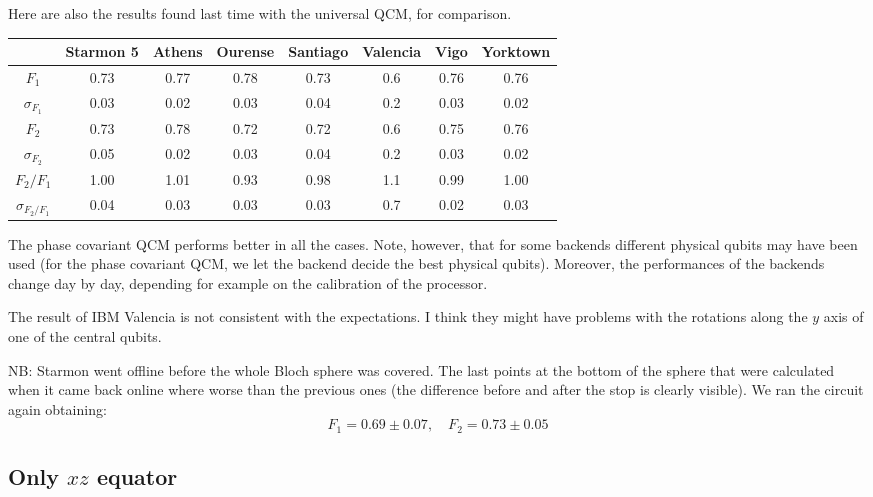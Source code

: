 \documentclass[11pt]{article}
\begin{document}
Here are also the results found last time with the universal QCM, for comparison.
\begin{table}[H]
    \centering
    \begin{tabular}{|c|c|c|c|c|c|c|c|}
    \hline
    \textbf{} & \textbf{Starmon 5} & \textbf{Athens} & \textbf{Ourense} & \textbf{Santiago} & \textbf{Valencia} & \textbf{Vigo} & \textbf{Yorktown} \\ \hline
    $F_1$              & 0.73 & 0.77 & 0.78 & 0.73 & 0.6 & 0.76 & 0.76 \\ \hline
    $\sigma_{F_1}$     & 0.03 & 0.02 & 0.03 & 0.04 & 0.2 & 0.03 & 0.02 \\ \hline
    $F_2$              & 0.73 & 0.78 & 0.72 & 0.72 & 0.6 & 0.75 & 0.76 \\ \hline
    $\sigma_{F_2}$     & 0.05 & 0.02 & 0.03 & 0.04 & 0.2 & 0.03 & 0.02 \\ \hline
    $F_2/F_1$          & 1.00 & 1.01 & 0.93 & 0.98 & 1.1 & 0.99 & 1.00 \\ \hline
    $\sigma_{F_2/F_1}$ & 0.04 & 0.03 & 0.03 & 0.03 & 0.7 & 0.02 & 0.03 \\ \hline
    \end{tabular}
\end{table}

The phase covariant QCM performs better in all the cases.
Note, however, that for some backends different physical qubits may have been used (for the phase covariant QCM, we let the backend decide the best physical qubits).
Moreover, the performances of the backends change day by day, depending for example on the calibration of the processor.

The result of IBM Valencia is not consistent with the expectations. I think they might have problems with the rotations along the $y$ axis of one of the central qubits.

NB: Starmon went offline before the whole Bloch sphere was covered. 
The last points at the bottom of the sphere that were calculated when it came back online where worse than the previous ones (the difference before and after the stop is clearly visible).
We ran the circuit again obtaining:
\[
    F_1=0.69 \pm 0.07, \quad F_2=0.73 \pm 0.05
\]

\subsection{Only $xz$ equator}
\end{document}
